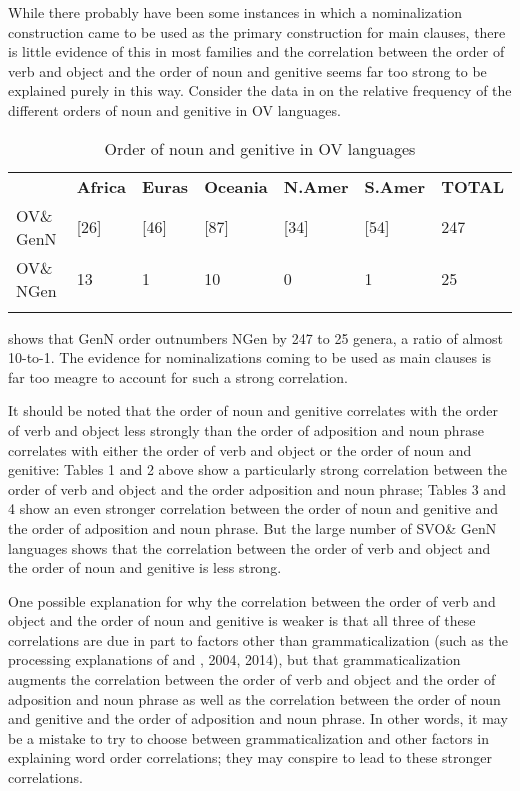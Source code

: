 \documentclass[output=paper]{langsci/langscibook}
\begin{document}
While there probably have been some instances in which a nominalization construction came to be used as the primary construction for main clauses, there is little evidence of this in most families and the correlation between the order of verb and object and the order of noun and genitive seems far too strong to be explained purely in this way. Consider the data in  on the relative frequency of the different orders of noun and genitive in OV languages.

\begin{table}
\begin{tabularx}{\textwidth}{XXXXXXX}
\lsptoprule
& \bfseries Africa & \bfseries Euras & \bfseries Oceania & \bfseries N.Amer & \bfseries S.Amer & \bfseries TOTAL\\
OV\& GenN & [26] & [46] & [87] & [34] & [54] & 247\\
OV\& NGen & 13 & 1 & 10 & 0 & 1 & 25\\
\lspbottomrule
\end{tabularx}
\caption{\label{tab:dryer:7}Order of noun and genitive in OV languages}
\end{table}

 shows that GenN order outnumbers NGen by 247 to 25 genera, a ratio of almost 10-to-1. The evidence for nominalizations coming to be used as main clauses is far too meagre to account for such a strong correlation.

It should be noted that the order of noun and genitive correlates with the order of verb and object less strongly than the order of adposition and noun phrase correlates with either the order of verb and object or the order of noun and genitive: Tables 1 and 2 above show a particularly strong correlation between the order of verb and object and the order adposition and noun phrase; Tables 3 and 4 show an even stronger correlation between the order of noun and genitive and the order of adposition and noun phrase. But the large number of SVO\& GenN languages shows that the correlation between the order of verb and object and the order of noun and genitive is less strong.

One possible explanation for why the correlation between the order of verb and object and the order of noun and genitive is weaker is that all three of these correlations are due in part to factors other than grammaticalization (such as the processing explanations of \citealt{Dryer1992} and \citealt{Hawkins1994}, 2004, 2014), but that grammaticalization augments the correlation between the order of verb and object and the order of adposition and noun phrase as well as the correlation between the order of noun and genitive and the order of adposition and noun phrase. In other words, it may be a mistake to try to choose between grammaticalization and other factors in explaining word order correlations; they may conspire to lead to these stronger correlations.
\end{document}
